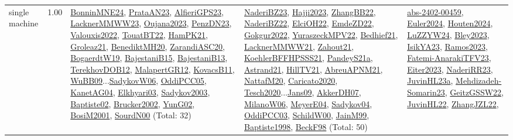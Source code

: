 {\begin{longtable}{p{3cm}r>{\raggedright\arraybackslash}p{6cm}>{\raggedright\arraybackslash}p{6cm}>{\raggedright\arraybackslash}p{8cm}}
\index{single machine}\index{Classification!single machine}single machine &  1.00 & \hyperref[detail:BonninMNE24]{BonninMNE24}, \hyperref[detail:PrataAN23]{PrataAN23}, \hyperref[detail:AlfieriGPS23]{AlfieriGPS23}, \hyperref[detail:LacknerMMWW23]{LacknerMMWW23}, \hyperref[detail:Oujana2023]{Oujana2023}, \hyperref[detail:PenzDN23]{PenzDN23}, \hyperref[detail:Valouxis2022]{Valouxis2022}, \hyperref[detail:TouatBT22]{TouatBT22}, \hyperref[detail:HamPK21]{HamPK21}, \hyperref[detail:Groleaz21]{Groleaz21}, \hyperref[detail:BenediktMH20]{BenediktMH20}, \hyperref[detail:ZarandiASC20]{ZarandiASC20}, \hyperref[detail:BogaerdtW19]{BogaerdtW19}, \hyperref[detail:BajestaniB15]{BajestaniB15}, \hyperref[detail:BajestaniB13]{BajestaniB13}, \hyperref[detail:TerekhovDOB12]{TerekhovDOB12}, \hyperref[detail:MalapertGR12]{MalapertGR12}, \hyperref[detail:KovacsB11]{KovacsB11}, \hyperref[detail:WuBB09]{WuBB09}...\hyperref[detail:SadykovW06]{SadykovW06}, \hyperref[detail:OddiPCC05]{OddiPCC05}, \hyperref[detail:KanetAG04]{KanetAG04}, \hyperref[detail:Elkhyari03]{Elkhyari03}, \hyperref[detail:Sadykov2003]{Sadykov2003}, \hyperref[detail:Baptiste02]{Baptiste02}, \hyperref[detail:Brucker2002]{Brucker2002}, \hyperref[detail:YunG02]{YunG02}, \hyperref[detail:BosiM2001]{BosiM2001}, \hyperref[detail:SourdN00]{SourdN00} (Total: 32) & \hyperref[detail:NaderiBZ23]{NaderiBZ23}, \hyperref[detail:Hajji2023]{Hajji2023}, \hyperref[detail:ZhangBB22]{ZhangBB22}, \hyperref[detail:NaderiBZ22]{NaderiBZ22}, \hyperref[detail:ElciOH22]{ElciOH22}, \hyperref[detail:EmdeZD22]{EmdeZD22}, \hyperref[detail:Gokgur2022]{Gokgur2022}, \hyperref[detail:YuraszeckMPV22]{YuraszeckMPV22}, \hyperref[detail:Bedhief21]{Bedhief21}, \hyperref[detail:LacknerMMWW21]{LacknerMMWW21}, \hyperref[detail:Zahout21]{Zahout21}, \hyperref[detail:KoehlerBFFHPSSS21]{KoehlerBFFHPSSS21}, \hyperref[detail:PandeyS21a]{PandeyS21a}, \hyperref[detail:Astrand21]{Astrand21}, \hyperref[detail:HillTV21]{HillTV21}, \hyperref[detail:AbreuAPNM21]{AbreuAPNM21}, \hyperref[detail:NattafM20]{NattafM20}, \hyperref[detail:Caricato2020]{Caricato2020}, \hyperref[detail:Tesch2020]{Tesch2020}...\hyperref[detail:Jans09]{Jans09}, \hyperref[detail:AkkerDH07]{AkkerDH07}, \hyperref[detail:MilanoW06]{MilanoW06}, \hyperref[detail:MeyerE04]{MeyerE04}, \hyperref[detail:Sadykov04]{Sadykov04}, \hyperref[detail:OddiPCC03]{OddiPCC03}, \hyperref[detail:SchildW00]{SchildW00}, \hyperref[detail:JainM99]{JainM99}, \hyperref[detail:Baptiste1998]{Baptiste1998}, \hyperref[detail:BeckF98]{BeckF98} (Total: 50) & \hyperref[detail:abs-2402-00459]{abs-2402-00459}, \hyperref[detail:Euler2024]{Euler2024}, \hyperref[detail:Houten2024]{Houten2024}, \hyperref[detail:LuZZYW24]{LuZZYW24}, \hyperref[detail:Bley2023]{Bley2023}, \hyperref[detail:IsikYA23]{IsikYA23}, \hyperref[detail:Ramos2023]{Ramos2023}, \hyperref[detail:Fatemi-AnarakiTFV23]{Fatemi-AnarakiTFV23}, \hyperref[detail:Eiter2023]{Eiter2023}, \hyperref[detail:NaderiRR23]{NaderiRR23}, \hyperref[detail:JuvinHL23a]{JuvinHL23a}, \hyperref[detail:Mehdizadeh-Somarin23]{Mehdizadeh-Somarin23}, \hyperref[detail:GeitzGSSW22]{GeitzGSSW22}, \hyperref[detail:JuvinHL22]{JuvinHL22}, \hyperref[detail:ZhangJZL22]{ZhangJZL22}, 
\end{longtable}}
